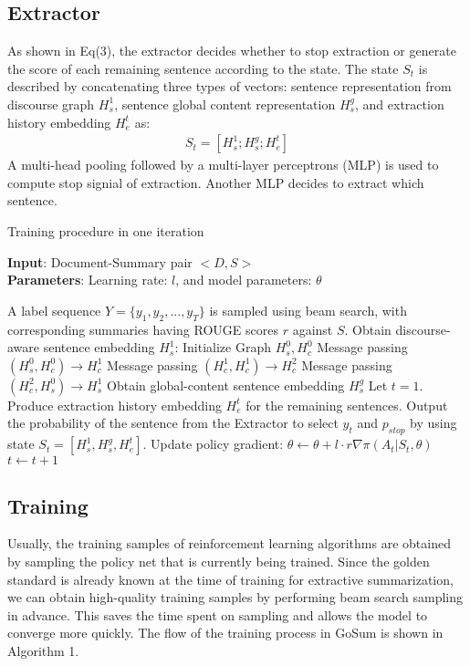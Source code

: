 \documentclass[11pt,a4paper]{article}
\begin{document}
\subsection{Extractor}
As shown in Eq(3), the extractor decides whether to stop extraction or generate the score of each remaining sentence according to the state.
The state $S_t$ is described by concatenating three types of vectors:
sentence representation from discourse graph $H_s^1$,
sentence global content representation ${H}_s^g$,
and extraction history embedding ${H}_e^t$ as:
\begin{align}
    S_t = [H_s^1;H_s^g;H_e^t]
\end{align}
A multi-head pooling followed by a multi-layer perceptrons (MLP) is used to compute stop signial of extraction. Another MLP decides to extract which sentence.





\begin{algorithm}[tb]
\caption{Training procedure in one iteration}
    \label{alg:algorithm}
    \textbf{Input}: Document-Summary pair $<D, S>$\\
    \textbf{Parameters}: Learning rate: $l$, and model parameters: $\theta$ \\
    \begin{algorithmic}[1]
        \STATE A label sequence ${Y}=\{y_1, y_2,...,y_T\}$ is sampled using beam search, with corresponding summaries having ROUGE scores $r$ against $S$.
        \STATE Obtain discourse-aware sentence embedding $H_s^1$:
        \STATE \quad Initialize Graph $H_s^0, H_c^0$
        \STATE \quad Message passing $(H_s^0, H_c^0) \rightarrow H_c^1$
        \STATE \quad Message passing $(H_c^1, H_c^1) \rightarrow H_c^2$
        \STATE \quad Message passing $(H_c^2, H_s^0) \rightarrow H_s^1$
        \STATE Obtain global-content sentence embedding $H_s^g$
        \STATE Let $t=1$.
            \STATE Produce extraction history embedding $H_e^t$ for the remaining sentences.
            \STATE Output the probability of the sentence from the Extractor to select $y_t$ and $p_{stop}$ by using state $S_t= [ H_s^1, H_s^g, H_e^t ]$.
            \STATE Update policy gradient: $\theta \leftarrow \theta + l \cdot r \nabla \pi(A_t|S_t,\theta) $
            \STATE $t \leftarrow t + 1$
        \ENDWHILE
    \end{algorithmic}
\end{algorithm}
 

\subsection{Training}
Usually, the training samples of reinforcement learning algorithms are obtained by sampling the policy net that is currently being trained. Since the golden standard is already known at the time of training for extractive summarization, we can obtain high-quality training samples by performing beam search sampling in advance.
This saves the time spent on sampling and allows the model to converge more quickly.
The flow of the training process in GoSum is shown in Algorithm 1.
%
 
\end{document}
